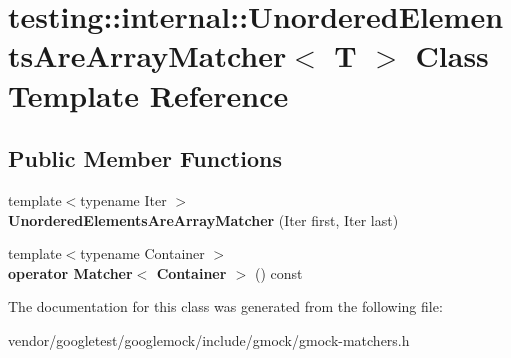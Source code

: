 \hypertarget{classtesting_1_1internal_1_1UnorderedElementsAreArrayMatcher}{}\section{testing\+:\+:internal\+:\+:Unordered\+Elements\+Are\+Array\+Matcher$<$ T $>$ Class Template Reference}
\label{classtesting_1_1internal_1_1UnorderedElementsAreArrayMatcher}
\subsection*{Public Member Functions}
\begin{DoxyCompactItemize}
\item 
{\footnotesize template$<$typename Iter $>$ }\\{\bfseries Unordered\+Elements\+Are\+Array\+Matcher} (Iter first, Iter last)\hypertarget{classtesting_1_1internal_1_1UnorderedElementsAreArrayMatcher_a5a91694cf5088cb0b7f4b1bb57dee957}{}\label{classtesting_1_1internal_1_1UnorderedElementsAreArrayMatcher_a5a91694cf5088cb0b7f4b1bb57dee957}

\item 
{\footnotesize template$<$typename Container $>$ }\\{\bfseries operator Matcher$<$ Container $>$} () const \hypertarget{classtesting_1_1internal_1_1UnorderedElementsAreArrayMatcher_a85c0528e207ce62a32218b35fddb05c5}{}\label{classtesting_1_1internal_1_1UnorderedElementsAreArrayMatcher_a85c0528e207ce62a32218b35fddb05c5}

\end{DoxyCompactItemize}


The documentation for this class was generated from the following file\+:\begin{DoxyCompactItemize}
\item 
vendor/googletest/googlemock/include/gmock/gmock-\/matchers.\+h\end{DoxyCompactItemize}
